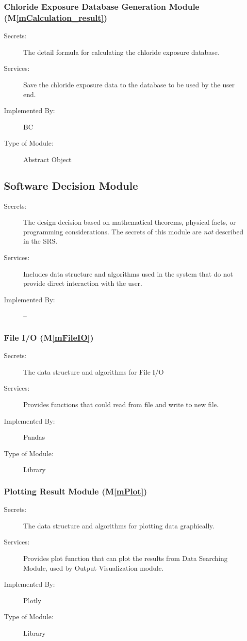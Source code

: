 \documentclass[12pt, titlepage]{article}
\newcommand{\mref}[1]{M\ref{#1}}
\begin{document}
\subsubsection{Chloride Exposure Database Generation Module (\mref{mCalculation_result})}
\begin{description}
\item[Secrets:] The detail formula for calculating the chloride exposure database.
\item[Services:] Save the chloride exposure data to the database to be used by the user end.
\item[Implemented By:] BC
\item[Type of Module:] Abstract Object
\end{description}


\subsection{Software Decision Module}

\begin{description}
\item[Secrets:] The design decision based on mathematical theorems, physical
  facts, or programming considerations. The secrets of this module are
  \emph{not} described in the SRS.
\item[Services:] Includes data structure and algorithms used in the system that
  do not provide direct interaction with the user. 
\item[Implemented By:] --
\end{description}

\subsubsection{File I/O (\mref{mFileIO})}
\begin{description}
\item[Secrets:] The data structure and algorithms for File I/O 
\item[Services:] Provides functions that could read from file and write to new file. 
\item[Implemented By:] Pandas
\item[Type of Module:] Library
\end{description}

\subsubsection{Plotting Result Module (\mref{mPlot})}
\begin{description}
\item[Secrets:] The data structure and algorithms for plotting data graphically. 
\item[Services:] Provides plot function that can plot the results from Data Searching Module, used by Output Visualization module. 
\item[Implemented By:] Plotly 
\item[Type of Module:] Library
\end{description}
\end{document}
